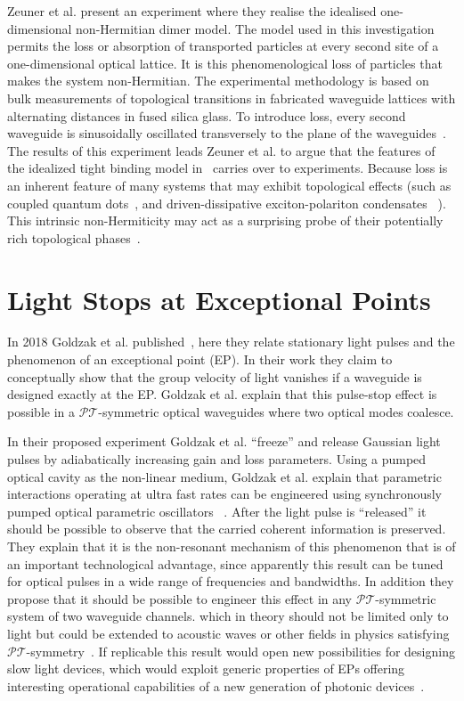 \documentclass[12pt, a4paper]{report}
\newcommand\PT{\(\mathcal{PT}\)}
\begin{document}
Zeuner et al. present an experiment where they realise the idealised one-dimensional non-Hermitian dimer model. The model used in this investigation permits the loss or absorption of transported particles at every second site of a one-dimensional optical lattice. It is this phenomenological loss of particles that makes the system non-Hermitian. The experimental methodology is based on bulk measurements of topological transitions in fabricated waveguide lattices with alternating distances in fused silica glass.
To introduce loss, every second waveguide is sinusoidally oscillated transversely to the plane of the waveguides~\cite{TopoTrans}.
The results of this experiment leads Zeuner et al. to argue that the features of the idealized tight binding model in~\cite{Rudner} carries over to experiments. Because loss is an inherent feature of many systems that may exhibit topological effects (such as coupled quantum dots~\cite{Rudner}, and driven-dissipative exciton-polariton condensates ~\cite{Cones}). This intrinsic non-Hermiticity may act as a surprising probe of their potentially rich topological phases~\cite{TopoTrans}.

\section{Light Stops at Exceptional Points}\label{StopLight}
In 2018 Goldzak et al. published~\cite{LightStopsatEPs}, here they relate stationary light pulses and the phenomenon of an exceptional point (EP). In their work they claim to conceptually show that the group velocity of light vanishes if a waveguide is designed exactly at the EP. Goldzak et al. explain that this pulse-stop effect is possible in a \PT-symmetric optical waveguides where two optical modes coalesce.

In their proposed experiment Goldzak et al. ``freeze'' and release Gaussian light pulses by adiabatically increasing gain and loss parameters. Using a pumped optical cavity as the non-linear medium, Goldzak et al. explain that parametric interactions operating at ultra fast rates can be engineered using synchronously pumped optical parametric oscillators ~\cite{LightStopsatEPs}. After the light pulse is ``released'' it should be possible to observe that the carried coherent information is preserved. They explain that it is the non-resonant mechanism of this phenomenon that is of an important technological advantage, since apparently this result can be tuned for optical pulses in a wide range of frequencies and bandwidths. In addition they propose that it should be possible to engineer this effect in any \PT-symmetric system of two waveguide channels. which in theory should not be limited only to light but could be extended to acoustic waves or other fields in physics satisfying \PT-symmetry~\cite{LightStopsatEPs}.
If replicable this result would open new possibilities for designing slow light devices, which would
exploit generic properties of EPs offering interesting operational capabilities of a new generation of photonic devices~\cite{LightStopsatEPs}.
\end{document}
